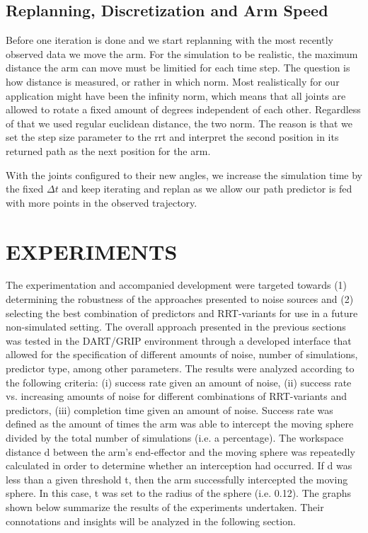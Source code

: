 \documentclass[letterpaper, 10 pt, conference]{ieeeconf}  %
\begin{document}

\subsection{Replanning, Discretization and Arm Speed}

Before one iteration is done and we start replanning with the most recently
observed data we move the arm. For the simulation to be realistic, the  maximum
distance the arm can move must be limitied for each time step. The question is
how distance is measured, or rather in which norm. Most realistically for our
application might have been the infinity norm, which means that all joints are
allowed to rotate a fixed amount of degrees independent of each other.
Regardless of that we used regular euclidean distance, the two norm. The reason
is that we set the step size parameter to the rrt and interpret the second
position in its returned path as the next position for the arm.

With the joints configured to their new angles, we increase the
simulation time by the fixed $\Delta t$ and keep iterating and replan as
we allow our path predictor is fed with more points in the observed trajectory.

\section{EXPERIMENTS}

The experimentation and accompanied development were targeted towards (1)
determining the robustness of the approaches presented to noise sources and (2)
selecting the best combination of predictors and RRT-variants for use in a
future non-simulated setting. The overall approach presented in the previous
sections was tested in the DART/GRIP environment through a developed interface
that allowed for the specification of different amounts of noise, number of
simulations, predictor type, among other parameters.  The results were analyzed
according to the following criteria: (i) success rate given an amount of noise,
(ii) success rate vs. increasing amounts of noise for different combinations of
RRT-variants and predictors, (iii) completion time given an amount of noise.
Success rate was defined as the amount of times the arm was able to intercept
the moving sphere divided by the total number of simulations (i.e. a
percentage). The workspace distance d between the arm’s end-effector and the
moving sphere was repeatedly calculated in order to determine whether an
interception had occurred. If d was less than a given threshold t, then the arm
successfully intercepted the moving sphere. In this case, t was set to the
radius of the sphere (i.e. 0.12).  The graphs shown below summarize the results
of the experiments undertaken. Their connotations and insights will be analyzed
in the following section.
\end{document}
